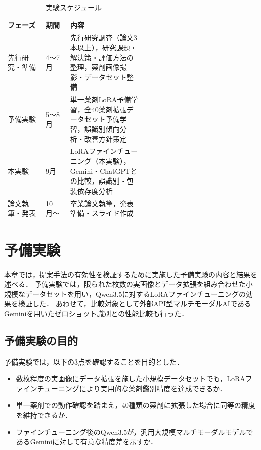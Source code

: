 \documentclass{ltjsarticle}
\begin{document}
\begin{table}[h]
\centering
\caption{実験スケジュール}
\label{tab:schedule}
\begin{tabular}{llp{0.55\linewidth}}
\hline
フェーズ & 期間 & 内容 \\
\hline
先行研究・準備 & 4〜7月 & 先行研究調査（論文3本以上），研究課題・解決策・評価方法の整理，薬剤画像撮影・データセット整備 \\
予備実験       & 5〜8月 & 単一薬剤LoRA予備学習，全40薬剤拡張データセット予備学習，誤識別傾向分析・改善方針策定 \\
本実験         & 9月    & LoRAファインチューニング（本実験），Gemini・ChatGPTとの比較，誤識別・包装依存度分析 \\
論文執筆・発表 & 10月〜 & 卒業論文執筆，発表準備・スライド作成 \\
\hline
\end{tabular}
\end{table}

\newpage

\section{予備実験}\label{sec4}

本章では，提案手法の有効性を検証するために実施した予備実験の内容と結果を述べる．
予備実験では，限られた枚数の実画像とデータ拡張を組み合わせた小規模なデータセットを用い，Qwen3.5に対するLoRAファインチューニングの効果を検証した．
あわせて，比較対象として外部API型マルチモーダルAIであるGeminiを用いたゼロショット識別との性能比較も行った．

\subsection{予備実験の目的}

予備実験では，以下の3点を確認することを目的とした．

\begin{itemize}
  \item 数枚程度の実画像にデータ拡張を施した小規模データセットでも，LoRAファインチューニングにより実用的な薬剤鑑別精度を達成できるか．
  \item 単一薬剤での動作確認を踏まえ，40種類の薬剤に拡張した場合に同等の精度を維持できるか．
  \item ファインチューニング後のQwen3.5が，汎用大規模マルチモーダルモデルであるGeminiに対して有意な精度差を示すか．
\end{itemize}
\end{document}
